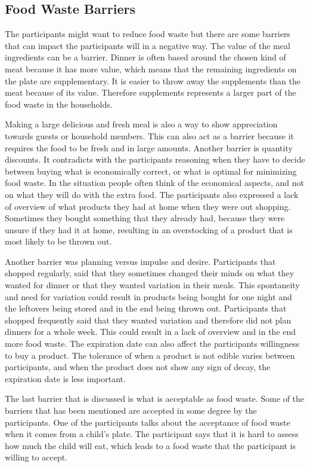 \subsection{Food Waste Barriers}
The participants might want to reduce food waste but there are some barriers that can impact the participants will in a negative way. The value of the meal ingredients can be a barrier. Dinner is often based around the chosen kind of meat because it has more value, which means that the remaining ingredients on the plate are supplementary. It is easier to throw away the supplements than the meat because of its value. Therefore supplements represents a larger part of the food waste in the households.

Making a large delicious and fresh meal is also a way to show appreciation towards guests or household members. This can also act as a barrier because it requires the food to be fresh and in large amounts. Another barrier is quantity discounts. It contradicts with the participants reasoning when they have to decide between buying what is economically correct, or what is optimal for minimizing food waste. In the situation people often think of the economical aspects, and not on what they will do with the extra food. The participants also expressed a lack of overview of what products they had at home when they were out shopping. Sometimes they bought something that they already had, because they were unsure if they had it at home, resulting in an overstocking of a product that is most likely to be thrown out.

Another barrier was planning versus impulse and desire. Participants that shopped regularly, said that they sometimes changed their minds on what they wanted for dinner or that they wanted variation in their meals. This spontaneity and need for variation could result in products being bought for one night and the leftovers being stored and in the end being thrown out. Participants that shopped frequently said that they wanted variation and therefore did not plan dinners for a whole week. This could result in a lack of overview and in the end more food waste. The expiration date can also affect the participants willingness to buy a product. The tolerance of when a product is not edible varies between participants, and when the product does not show any sign of decay, the expiration date is less important.

The last barrier that is discussed is what is acceptable as food waste. Some of the barriers that has been mentioned are accepted in some degree by the participants. One of the participants talks about the acceptance of food waste when it comes from a child's plate. The participant says that it is hard to assess how much the child will eat, which leads to a food waste that the participant is willing to accept.